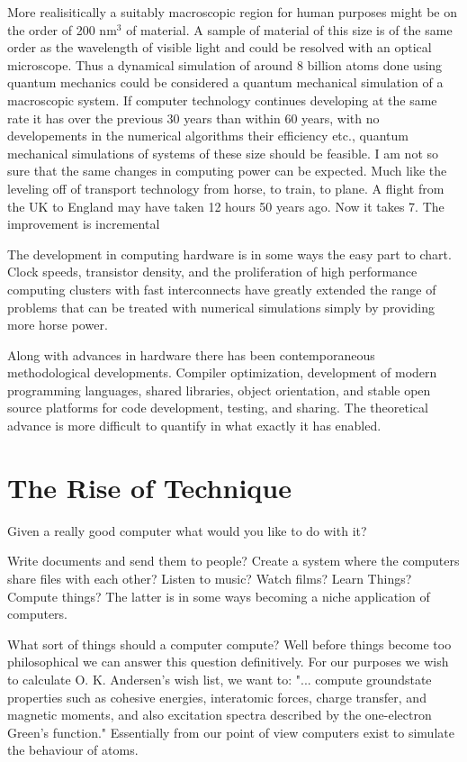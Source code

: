 More realisitically a suitably macroscopic region for human purposes might be on the 
order of 200 nm$^{3}$ of material. A sample of 
material of this size is of the same order as the wavelength of visible light and could be
resolved with an optical microscope. Thus a dynamical simulation of around 8 billion atoms
done using quantum mechanics could be considered a quantum mechanical simulation of
a macroscopic system. If computer technology continues developing at the same rate it has
over the previous 30 years than within 60 years, with no developements in the numerical
algorithms their efficiency etc., quantum mechanical simulations of systems of these 
size should be feasible. I am not so sure that the same changes in computing
power can be expected. Much like the leveling off of transport technology from
horse, to train, to plane. A flight from the UK to England may have taken 12 hours
50 years ago. Now it takes 7. The improvement is incremental 

The development in computing hardware is in some ways the easy part to chart. 
Clock speeds, transistor density, and the proliferation of high 
performance computing clusters with fast interconnects have greatly extended 
the range of problems that can be treated with numerical simulations
simply by providing more horse power.

Along with advances in hardware there has been contemporaneous methodological developments.
Compiler optimization, development of modern programming languages, 
shared libraries, object orientation, and stable open source platforms for 
code development, testing, and sharing. The theoretical advance is more difficult
to quantify in what exactly it has enabled.

\section{The Rise of Technique}
Given a really good computer what would you like to do with it?

Write documents and send them to people? Create a system where the computers share files
with each other? Listen to music? Watch films? Learn Things? Compute things? The latter is in some
ways becoming a niche application of computers.

What sort of things should a computer compute? Well before things become too philosophical we
can answer this question definitively.
For our purposes we wish to calculate O. K. Andersen's wish list, we want to:
"... compute groundstate properties such as cohesive energies, interatomic forces, charge transfer, and magnetic moments,
and also excitation spectra described by the one-electron Green's function." \cite{anderson75} 
Essentially from our point of view computers exist to simulate the behaviour of atoms.


